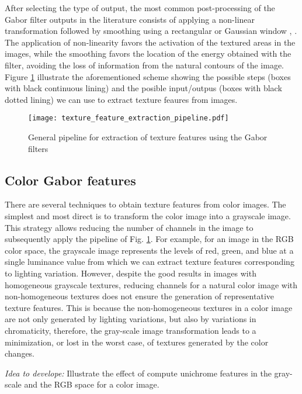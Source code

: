 After selecting the type of output, the most common post-processing of the Gabor filter outputs in the literature consists of applying a non-linear transformation followed by smoothing using a rectangular or Gaussian window \cite{Randen.Husoy:TPAMI:1999}, \cite{Clausi.EdJernigan:JPR:2000}. The application of non-linearity favors the activation of the textured areas in the images, while the smoothing favors the location of the energy obtained with the filter, avoiding the loss of information from the natural contours of the image. Figure \ref{fig:general_pipeline_gabor_feature_extraction} illustrate the aforementioned scheme showing the possible steps (boxes with black continuous lining) and the posible input/outpus (boxes with black dotted lining) we can use to extract texture feaures from images.

\begin{figure}
\centering
\texttt{[image: texture\_feature\_extraction\_pipeline.pdf]}
\caption{General pipeline for extraction of texture features using the Gabor filters}\label{fig:general_pipeline_gabor_feature_extraction}
\end{figure}

\subsection{Color Gabor features}

There are several techniques to obtain texture features from color images. The simplest and most direct is to transform the color image into a grayscale image. This strategy allows reducing the number of channels in the image to subsequently apply the pipeline of Fig. \ref{fig:general_pipeline_gabor_feature_extraction}. For example, for an image in the RGB color space, the grayscale image represents the levels of red, green, and blue at a single luminance value from which we can extract texture features corresponding to lighting variation. However, despite the good results in images with homogeneous grayscale textures, reducing channels for a natural color image with non-homogeneous textures does not ensure the generation of representative texture features. This is because the non-homogeneous textures in a color image are not only generated by lighting variations,  but also by variations in chromaticity, therefore, the gray-scale image transformation leads to a minimization, or lost in the worst case, of textures generated by the color changes.


\textit{Idea to develope:} Illustrate the effect of compute unichrome features in the gray-scale and the RGB space for a color image.


